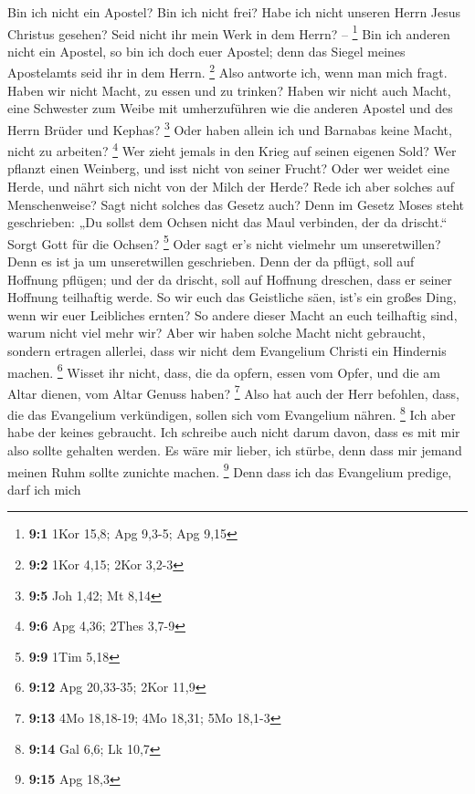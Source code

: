  Bin ich nicht ein Apostel? Bin ich nicht frei? Habe ich
nicht unseren Herrn Jesus Christus gesehen? Seid nicht ihr mein Werk in
dem Herrn? -- \footnote{\textbf{9:1} 1Kor 15,8; Apg 9,3-5; Apg 9,15}
 Bin ich anderen nicht ein Apostel, so bin ich doch euer
Apostel; denn das Siegel meines Apostelamts seid ihr in dem Herrn.
\footnote{\textbf{9:2} 1Kor 4,15; 2Kor 3,2-3}  Also
antworte ich, wenn man mich fragt.  Haben wir nicht Macht,
zu essen und zu trinken?  Haben wir nicht auch Macht, eine
Schwester zum Weibe mit umherzuführen wie die anderen Apostel und des
Herrn Brüder und Kephas? \footnote{\textbf{9:5} Joh 1,42; Mt 8,14}
 Oder haben allein ich und Barnabas keine Macht, nicht zu
arbeiten? \footnote{\textbf{9:6} Apg 4,36; 2Thes 3,7-9} 
Wer zieht jemals in den Krieg auf seinen eigenen Sold? Wer pflanzt einen
Weinberg, und isst nicht von seiner Frucht? Oder wer weidet eine Herde,
und nährt sich nicht von der Milch der Herde?  Rede ich
aber solches auf Menschenweise? Sagt nicht solches das Gesetz auch?
 Denn im Gesetz Moses steht geschrieben: „Du sollst dem
Ochsen nicht das Maul verbinden, der da drischt.`` Sorgt Gott für die
Ochsen? \footnote{\textbf{9:9} 1Tim 5,18}  Oder sagt er's
nicht vielmehr um unseretwillen? Denn es ist ja um unseretwillen
geschrieben. Denn der da pflügt, soll auf Hoffnung pflügen; und der da
drischt, soll auf Hoffnung dreschen, dass er seiner Hoffnung teilhaftig
werde.  So wir euch das Geistliche säen, ist's ein großes
Ding, wenn wir euer Leibliches ernten?  So andere dieser
Macht an euch teilhaftig sind, warum nicht viel mehr wir? Aber wir haben
solche Macht nicht gebraucht, sondern ertragen allerlei, dass wir nicht
dem Evangelium Christi ein Hindernis machen. \footnote{\textbf{9:12} Apg
  20,33-35; 2Kor 11,9}  Wisset ihr nicht, dass, die da
opfern, essen vom Opfer, und die am Altar dienen, vom Altar Genuss
haben? \footnote{\textbf{9:13} 4Mo 18,18-19; 4Mo 18,31; 5Mo 18,1-3}
 Also hat auch der Herr befohlen, dass, die das
Evangelium verkündigen, sollen sich vom Evangelium nähren. \footnote{\textbf{9:14}
  Gal 6,6; Lk 10,7}  Ich aber habe der keines gebraucht.
Ich schreibe auch nicht darum davon, dass es mit mir also sollte
gehalten werden. Es wäre mir lieber, ich stürbe, denn dass mir jemand
meinen Ruhm sollte zunichte machen. \footnote{\textbf{9:15} Apg 18,3}
 Denn dass ich das Evangelium predige, darf ich mich

